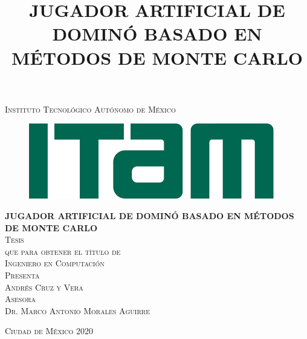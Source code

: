\documentclass[11pt, oneside]{book}
\begin{document}

\title{ JUGADOR ARTIFICIAL DE DOMINÓ BASADO EN MÉTODOS DE MONTE CARLO} %

\begin{titlepage}
      \begin{center}

            \textsc{\Large Instituto Tecnológico Autónomo de México}\\[2em]

            \begin{figure}[h]
                  \begin{center}
                        \includegraphics[scale=0.50]{itam_logo.png}
                  \end{center}
            \end{figure}


            \textbf{\LARGE JUGADOR ARTIFICIAL DE DOMINÓ BASADO EN MÉTODOS DE MONTE CARLO}\\[2em]

            \textsc{\large Tesis}\\[1em]

            \textsc{\large que para obtener el título de}\\[1em]

            \textsc{\LARGE Ingeniero en Computación}\\[1em]

            \textsc{\large Presenta}\\[1em]

            \textsc{\LARGE Andrés Cruz y Vera}\\[1em]

            \textsc{\large Asesora}\\[1em]

            \textsc{\LARGE Dr. Marco Antonio Morales Aguirre}\\[2em]


      \end{center}

      \vspace*{\fill}
      \textsc{Ciudad de México \hspace*{\fill} 2020}

\end{titlepage}
\end{document}

